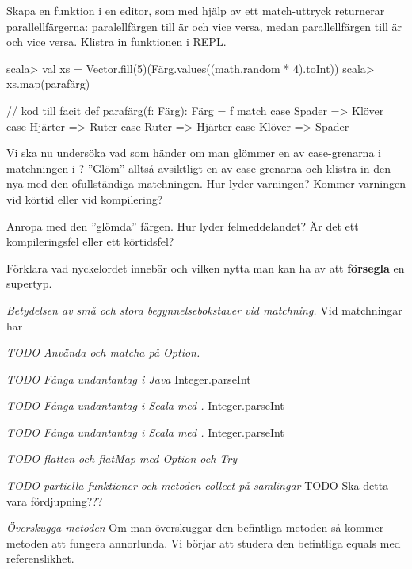 \Subtask Skapa en funktion  i en editor, som med hjälp av ett match-uttryck returnerar parallellfärgerna: paralellfärgen till  är  och vice versa, medan parallellfärgen till  är  och vice versa. Klistra in funktionen i REPL.
\begin{REPL}
scala> val xs = Vector.fill(5)(Färg.values((math.random * 4).toInt))  
scala> xs.map(parafärg)
\end{REPL}

\begin{Code}
// kod till facit
def parafärg(f: Färg): Färg = f match {
  case Spader  => Klöver
  case Hjärter => Ruter
  case Ruter   => Hjärter
  case Klöver  => Spader
}
\end{Code}

\Subtask Vi ska nu undersöka vad som händer om man glömmer en av case-grenarna i matchningen i ? ''Glöm'' alltså avsiktligt en av case-grenarna och klistra in den nya  med den ofullständiga matchningen. Hur lyder varningen? Kommer varningen vid körtid eller vid kompilering? 

\Subtask Anropa  med den ''glömda'' färgen. Hur lyder felmeddelandet? Är det ett kompileringsfel eller ett körtidsfel?

\Subtask\Pen Förklara vad nyckelordet  innebär och vilken nytta man kan ha av att \textbf{försegla} en supertyp.


\Task \emph{Betydelsen av små och stora begynnelsebokstaver vid matchning.} Vid matchningar har 



\Task \emph{TODO Använda och matcha på Option.}  

\Task \emph{TODO Fånga undantantag i Java} Integer.parseInt

\Task \emph{TODO Fånga undantantag i Scala med .} Integer.parseInt

\Task \emph{TODO Fånga undantantag i Scala med .} Integer.parseInt  

\Task \emph{TODO flatten och flatMap med Option och Try}

\Task \emph{TODO partiella funktioner och metoden collect på samlingar} TODO Ska detta vara fördjupning???


\Task \emph{Överskugga metoden }  Om man överskuggar den befintliga metoden  så kommer metoden \code{==} att fungera annorlunda. Vi börjar att studera den befintliga equals med referenslikhet.

